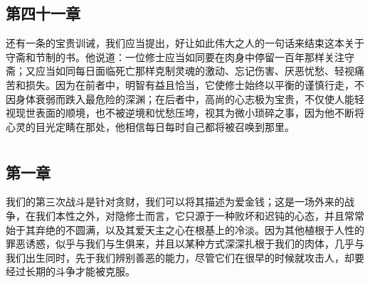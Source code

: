 
\subsection{第四十一章}

\par

还有一条的宝贵训诫，我们应当提出，好让如此伟大之人的一句话来结束这本关于守斋和节制的书。他说道：一位修士应当如同要在肉身中停留一百年那样关注守斋；又应当如同每日面临死亡那样克制灵魂的激动、忘记伤害、厌恶忧愁、轻视痛苦和损失。因为在前者中，明智有益且恰当，它使修士始终以平衡的谨慎行走，不因身体衰弱而跌入最危险的深渊；在后者中，高尚的心志极为宝贵，不仅使人能轻视现世表面的顺境，也不被逆境和忧愁压垮，视其为微小琐碎之事，因为他不断将心灵的目光定睛在那处，他相信每日每时自己都将被召唤到那里。\par



\section{}


\subsection{第一章}

\par

我们的第三次战斗是针对贪财，我们可以将其描述为爱金钱；这是一场外来的战争，在我们本性之外，对隐修士而言，它只源于一种败坏和迟钝的心态，并且常常始于其弃绝的不圆满，以及其爱天主之心在根基上的冷淡。因为其他植根于人性的罪恶诱惑，似乎与我们与生俱来，并且以某种方式深深扎根于我们的肉体，几乎与我们出生同时，先于我们辨别善恶的能力，尽管它们在很早的时候就攻击人，却要经过长期的斗争才能被克服。\par


